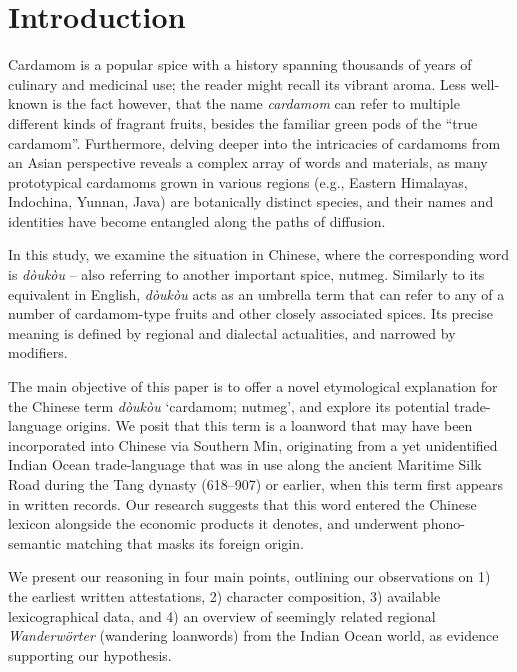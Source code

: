 \documentclass[12pt]{article}
\newcommand{\tc}[1]{\traditionalchinesefont{#1}\rmfamily}
\begin{document}
\section{Introduction}

Cardamom is a popular spice with a history spanning thousands of years of culinary and medicinal use; the reader might recall its vibrant aroma. Less well-known is the fact however, that the name \textit{cardamom} can refer to multiple different kinds of fragrant fruits, besides the familiar green pods of the ``true cardamom''. Furthermore, delving deeper into the intricacies of cardamoms from an Asian perspective reveals a complex array of words and materials, as many prototypical cardamoms grown in various regions (e.g., Eastern Himalayas, Indochina, Yunnan, Java) are botanically distinct species, and their names and identities have become entangled along the paths of diffusion.

In this study, we examine the situation in Chinese, where the corresponding word is \tc{豆蔻} \textit{dòukòu} -- also referring to another important spice, nutmeg. Similarly to its equivalent in English, \textit{dòukòu} acts as an umbrella term that can refer to any of a number of cardamom-type fruits and other closely associated spices. Its precise meaning is defined by regional and dialectal actualities, and narrowed by modifiers.

The main objective of this paper is to offer a novel etymological explanation for the Chinese term \textit{dòukòu} `cardamom; nutmeg', and explore its potential trade-language origins. We posit that this term is a loanword that may have been incorporated into Chinese via Southern Min, originating from a yet unidentified Indian Ocean trade-language that was in use along the ancient Maritime Silk Road during the Tang dynasty (618--907) or earlier, when this term first appears in written records. Our research suggests that this word entered the Chinese lexicon alongside the economic products it denotes, and underwent phono-semantic matching that masks its foreign origin. 

We present our reasoning in four main points, outlining our observations on 1) the earliest written attestations, 2) character composition, 3) available lexicographical data, and 4) an overview of seemingly related regional \textit{Wanderwörter} (wandering loanwords) from the Indian Ocean world, as evidence supporting our hypothesis.

\end{document}
